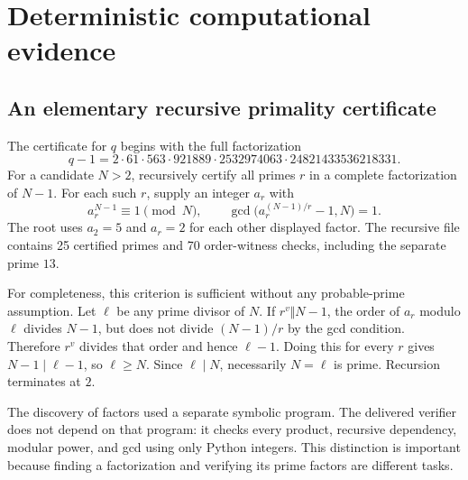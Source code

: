 \section{Deterministic computational evidence}\label{signed:sec:prime}
\subsection{An elementary recursive primality certificate}
The certificate for \(q\) begins with the full factorization
\[
 q-1=2\cdot61\cdot563\cdot921889\cdot2532974063
              \cdot24821433536218331.
\]
For a candidate \(N>2\), recursively certify all primes \(r\) in a complete factorization of \(N-1\). For each such \(r\), supply an integer \(a_r\) with
\begin{equation}\label{signed:eq:lucas}
 a_r^{N-1}\equiv1\pmod N,\qquad
 \gcd\bigl(a_r^{(N-1)/r}-1,N\bigr)=1.
\end{equation}
The root uses \(a_2=5\) and \(a_r=2\) for each other displayed factor. The recursive file contains 25 certified primes and 70 order-witness checks, including the separate prime \(13\).

For completeness, this criterion is sufficient without any probable-prime assumption. Let \(\ell\) be any prime divisor of \(N\). If \(r^v\Vert N-1\), the order of \(a_r\) modulo \(\ell\) divides \(N-1\), but does not divide \((N-1)/r\) by the gcd condition. Therefore \(r^v\) divides that order and hence \(\ell-1\). Doing this for every \(r\) gives \(N-1\mid\ell-1\), so \(\ell\ge N\). Since \(\ell\mid N\), necessarily \(N=\ell\) is prime. Recursion terminates at \(2\).

The discovery of factors used a separate symbolic program. The delivered verifier does not depend on that program: it checks every product, recursive dependency, modular power, and gcd using only Python integers. This distinction is important because finding a factorization and verifying its prime factors are different tasks.

